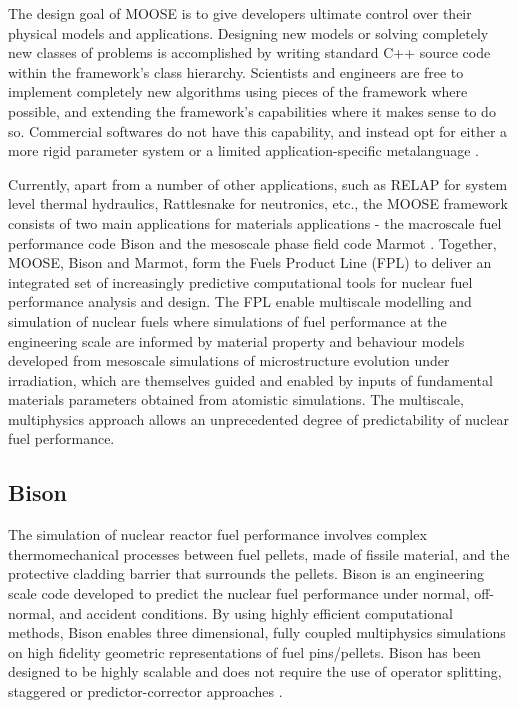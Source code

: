 	The design goal of {MOOSE} is to give developers ultimate control over their physical models and applications. Designing new models or solving completely new classes of problems is accomplished by writing standard C++ source code within the framework's class hierarchy. Scientists and engineers are free to implement completely new algorithms using pieces of the framework where possible, and extending the framework's capabilities where it makes sense to do so. Commercial softwares do not have this capability, and instead opt for either a more rigid parameter system or a limited application-specific metalanguage \cite{moose-web-page}.

	Currently, apart from a number of other applications, such as {RELAP} \cite{Zhang:aa} for system level thermal hydraulics, {Rattlesnake} \cite{Wang:aa} for neutronics, etc., the {MOOSE} framework consists of two main applications for materials applications - the macroscale fuel performance code {Bison} \cite{Newman09} and the mesoscale phase field code {Marmot}  \cite{Tonks12}. Together, {MOOSE}, {Bison}  and {Marmot}, form the Fuels Product Line (FPL) to deliver an integrated set of increasingly predictive computational tools for nuclear fuel performance analysis and design. The FPL enable multiscale modelling and simulation of nuclear fuels where simulations of fuel performance at the engineering scale are informed by material property and behaviour models developed from mesoscale simulations of microstructure evolution under irradiation, which are themselves guided and enabled by inputs of fundamental materials parameters obtained from atomistic simulations. The multiscale, multiphysics approach allows an unprecedented degree of predictability of nuclear fuel performance.

	\subsection{Bison}
	The simulation of nuclear reactor fuel performance involves complex thermomechanical processes between fuel pellets, made of fissile material, and the protective cladding barrier that surrounds the pellets. {Bison} is an engineering scale code developed to predict the nuclear fuel performance under normal, off-normal, and accident conditions. By using highly efficient computational methods, {Bison} enables three dimensional, fully coupled multiphysics simulations on high fidelity geometric representations of fuel pins/pellets. {Bison} has been designed to be highly scalable and does not require the use of operator splitting, staggered or predictor-corrector approaches \cite{WILLIAMSON2012149}.

